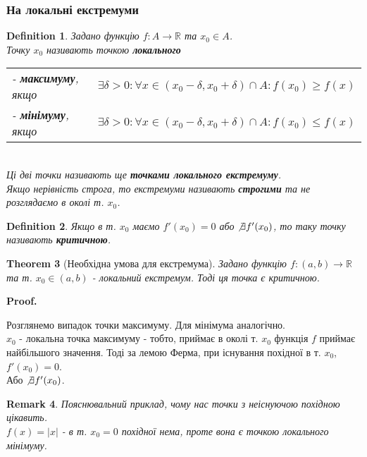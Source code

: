 \documentclass[a4paper, 14pt]{article}
\makeatletter
\def\qed{$\blacksquare$}
\theoremstyle{theoremdd}
\newtheorem{theorem}{Theorem}[subsection]
\theoremstyle{theoremdd}
\newtheorem{definition}[theorem]{Definition}
\theoremstyle{theoremdd}
\theoremstyle{theoremdd}
\theoremstyle{theoremdd}
\theoremstyle{theoremdd}
\newtheorem{remark}[theorem]{Remark}
\theoremstyle{theoremdd}
\theoremstyle{theoremdd}
\renewenvironment{proof}[1][Proof.\\]{\par
\pushQED{\hfill \qed}%
\normalfont \topsep6\p@\@plus6\p@\relax
\trivlist
\item\relax
{\bfseries
#1\@addpunct{.}}\hspace\labelsep\ignorespaces
}{%
\popQED\endtrivlist\@endpefalse
}
\makeatother
\begin{document}
\subsubsection{На локальні екстремуми}
\begin{definition}
Задано функцію $f: A \to \mathbb{R}$ та $x_0 \in A$.\\
Точку $x_0$ називають точкою \textbf{локального}\\
\begin{tabular}{ll}
- \textbf{максимуму}, якщо & $\exists \delta > 0: \forall x \in (x_0-\delta, x_0 +\delta) \cap A: f(x_0) \geq f(x)$\\
- \textbf{мінімуму}, якщо & $\exists \delta > 0: \forall x \in (x_0-\delta, x_0 +\delta) \cap A: f(x_0) \leq f(x)$
\end{tabular}\\
Ці дві точки називають ще \textbf{точками локального екстремуму}.\\
Якщо нерівність строга, то екстремуми називають \textbf{строгими} та не розглядаємо в околі т. $x_0$.
\end{definition}

\begin{definition}
Якщо в т. $x_0$ маємо $f'(x_0) = 0$ або $\not\exists f'(x_0)$, то таку точку називають \textbf{критичною}.
\end{definition}

\begin{theorem}[Необхідна умова для екстремума]
Задано функцію $f: (a,b) \to \mathbb{R}$ та т. $x_0 \in (a,b)$ - локальний екстремум. Тоді ця точка є критичною.\\
\end{theorem}

\begin{proof}
Розглянемо випадок точки максимуму. Для мінімума аналогічно.\\
$x_0$ - локальна точка максимуму - тобто, приймає в околі т. $x_0$ функція $f$ приймає найбільшого значення. Тоді за лемою Ферма, при існування похідної в т. $x_0$, $f'(x_0) = 0$.\\
Або $\not\exists f'(x_0)$.
\end{proof}

\begin{remark}
Пояснювальний приклад, чому нас точки з неіснуючою похідною цікавить.\\
$f(x) = |x|$ - в т. $x_0 = 0$ похідної нема, проте вона є точкою локального мінімуму.
\end{remark}
\end{document}
